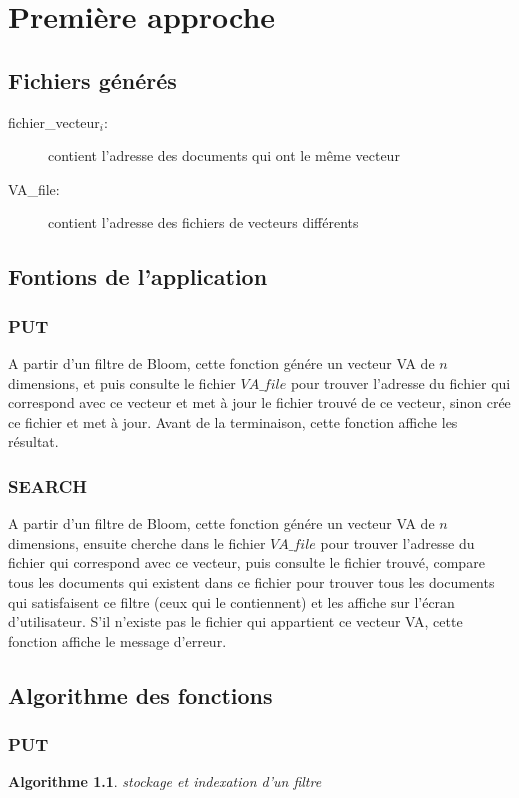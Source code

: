 \documentclass[a4paper,12pt]{report}
\begin{document}
\chapter{Première approche}
	\section{Fichiers générés}

	\begin{description}
		\item[fichier\_vecteur$_i$:] contient l'adresse des documents qui ont le même vecteur
		\item[VA\_file:] contient l'adresse des fichiers de vecteurs différents
	\end{description}
	
	\section{Fontions de l'application}
		\subsection{PUT}
		A partir d'un filtre de Bloom, cette fonction génére un vecteur VA de $n$ dimensions, et puis consulte le fichier $VA\_file$ pour trouver l'adresse du fichier qui correspond avec ce vecteur et met à jour le fichier trouvé de ce vecteur, sinon crée ce fichier et met à jour. Avant de la terminaison, cette fonction affiche les résultat.
	
		\subsection{SEARCH}
		A partir d'un filtre de Bloom, cette fonction génére un vecteur VA de $n$ dimensions, ensuite cherche dans le fichier $VA\_file$ pour trouver l'adresse du fichier qui correspond avec ce vecteur, puis consulte le fichier trouvé, compare tous les documents qui existent dans ce fichier pour trouver tous les documents qui satisfaisent ce filtre (ceux qui le contiennent) et les affiche sur l'écran d'utilisateur. S'il n'existe pas le fichier qui appartient ce vecteur VA, cette fonction affiche le message d'erreur.

\section{Algorithme des fonctions}
	\subsection{PUT}
\newtheorem{algorithme}{Algorithme}
\begin{algorithme}
	stockage et indexation d'un filtre
\end{algorithme}
\end{document}
